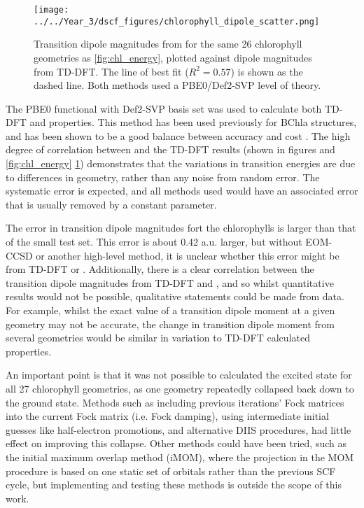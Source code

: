 \begin{figure}
\centering
\texttt{[image: ../../Year\_3/dscf\_figures/chlorophyll\_dipole\_scatter.png]}
\caption{Transition dipole magnitudes from \dscf for the same 26 chlorophyll geometries as
\ref{fig:chl_energy}, plotted against dipole magnitudes from TD-DFT. The line of
best fit ($R^2= 0.57$) is shown as the dashed line. Both methods used a PBE0/Def2-SVP
level of theory.}
\label{fig:chl_dipole}
\end{figure}

The PBE0 functional with Def2-SVP basis set \cite{Adamo1999, Schafer1992} was used
to calculate both TD-DFT and \dscf properties. This method has been used previously
for BChla structures, and has been shown to be a good balance between accuracy and 
cost \cite{Stross2016}. The high degree of correlation between \dscf and the TD-DFT
results (shown in figures and \ref{fig:chl_energy} \ref{fig:chl_dipole}) demonstrates
that the variations in transition energies are due to differences in geometry, rather
than any noise from random error. The systematic error is expected, and all methods
used would have an associated error that is usually removed by a constant parameter.

The error in transition dipole magnitudes fort the chlorophylls is larger than that
of the small test set. This error is about 0.42 a.u. larger, but without EOM-CCSD 
or another high-level method, it is unclear whether this error might be from TD-DFT 
or \dscf. Additionally, there is a clear correlation between the transition dipole
magnitudes from TD-DFT and \dscf, and so whilst quantitative results would not be
possible, qualitative statements could be made from \dscf data. For example, whilst 
the exact value of a transition dipole moment at a given geometry may not be accurate, 
the change in transition dipole moment from several geometries would be similar 
in variation to TD-DFT calculated properties.

An important point is that it was not possible to calculated the excited state for
all 27 chlorophyll geometries, as one geometry repeatedly collapsed back down to
the ground state. Methods such as including previous iterations' Fock matrices into
the current Fock matrix (i.e. Fock damping), using intermediate initial guesses 
like half-electron promotions, and alternative DIIS procedures, had little effect 
on improving this collapse. Other methods could have been tried, such as the initial
maximum overlap method (iMOM), where the projection in the MOM procedure is based 
on one static set of orbitals rather than the previous SCF cycle, but implementing
and testing these methods is outside the scope of this work.

